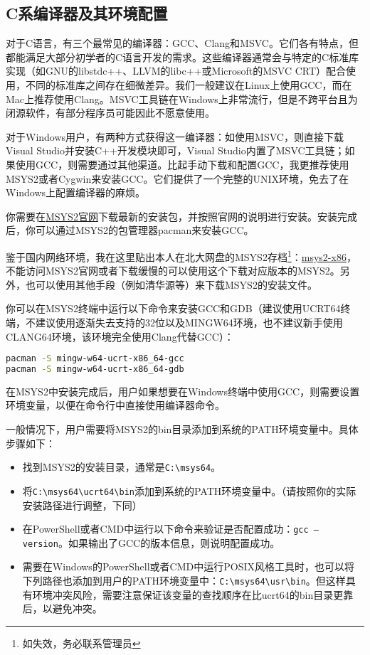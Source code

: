 \subsection{C系编译器及其环境配置}\label{sec:c-install}

对于C语言，有三个最常见的编译器：GCC、Clang和MSVC。它们各有特点，但都能满足大部分初学者的C语言开发的需求。这些编译器通常会与特定的C标准库实现（如GNU的libstdc++、LLVM的libc++或Microsoft的MSVC CRT）配合使用，不同的标准库之间存在细微差异。我们一般建议在Linux上使用GCC，而在Mac上推荐使用Clang。MSVC工具链在Windows上非常流行，但是不跨平台且为闭源软件，有部分程序员可能因此不愿意使用。

对于Windows用户，有两种方式获得这一编译器：如使用MSVC，则直接下载Visual Studio并安装C++开发模块即可，Visual Studio内置了MSVC工具链；如果使用GCC，则需要通过其他渠道。比起手动下载和配置GCC，我更推荐使用MSYS2或者Cygwin来安装GCC。它们提供了一个完整的UNIX环境，免去了在Windows上配置编译器的麻烦。

你需要在\href{https://www.msys2.org/}{MSYS2官网}下载最新的安装包，并按照官网的说明进行安装。安装完成后，你可以通过MSYS2的包管理器pacman来安装GCC。

鉴于国内网络环境，我在这里贴出本人在北大网盘的MSYS2存档\footnote{如失效，务必联系管理员}：\href{https://disk.pku.edu.cn/link/AADF534C03FA714DC982607A17BEF8A178}{msys2-x86}，不能访问MSYS2官网或者下载缓慢的可以使用这个下载对应版本的MSYS2。另外，也可以使用其他手段（例如清华源等）来下载MSYS2的安装文件。

你可以在MSYS2终端中运行以下命令来安装GCC和GDB（建议使用UCRT64终端，不建议使用逐渐失去支持的32位以及MINGW64环境，也不建议新手使用CLANG64环境，该环境完全使用Clang代替GCC）：

\begin{lstlisting}[language=bash]
pacman -S mingw-w64-ucrt-x86_64-gcc
pacman -S mingw-w64-ucrt-x86_64-gdb
\end{lstlisting}

在MSYS2中安装完成后，用户如果想要在Windows终端中使用GCC，则需要设置环境变量，以便在命令行中直接使用编译器命令。

一般情况下，用户需要将MSYS2的bin目录添加到系统的PATH环境变量中。具体步骤如下：

\begin{itemize}
  \item 找到MSYS2的安装目录，通常是\texttt{C:\textbackslash msys64}。
  \item 将\texttt{C:\textbackslash msys64\textbackslash ucrt64\textbackslash bin}添加到系统的PATH环境变量中。（请按照你的实际安装路径进行调整，下同）
  \item 在PowerShell或者CMD中运行以下命令来验证是否配置成功：\texttt{gcc --version}。如果输出了GCC的版本信息，则说明配置成功。
  \item 需要在Windows的PowerShell或者CMD中运行POSIX风格工具时，也可以将下列路径也添加到用户的PATH环境变量中：\texttt{C:\textbackslash msys64\textbackslash usr\textbackslash bin}。但这样具有环境冲突风险，需要注意保证该变量的查找顺序在比ucrt64的bin目录更靠后，以避免冲突。
\end{itemize}

